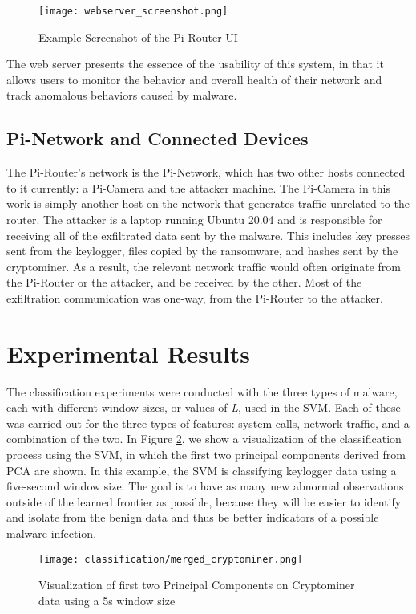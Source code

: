 \documentclass[runningheads]{llncs}
\begin{document}
\begin{figure}
    \centering
    \texttt{[image: webserver\_screenshot.png]}
    \caption{Example Screenshot of the Pi-Router UI\label{fig:webserver}}
\end{figure}

\indent The web server presents the essence of the usability of this system, in that it allows users to monitor the behavior and overall health of their network and track anomalous behaviors caused by malware.

\subsection{Pi-Network and Connected Devices}
The Pi-Router's network is the Pi-Network, which has two other hosts connected to it currently: a Pi-Camera and the attacker machine. The Pi-Camera in this work is simply another host on the network that generates traffic unrelated to the router. The attacker is a laptop running Ubuntu 20.04 and is responsible for receiving all of the exfiltrated data sent by the malware. This includes key presses sent from the keylogger, files copied by the ransomware, and hashes sent by the cryptominer. As a result, the relevant network traffic would often originate from the Pi-Router or the attacker, and be received by the other. Most of the exfiltration communication was one-way, from the Pi-Router to the attacker.

\section{Experimental Results}
The classification experiments were conducted with the three types of malware, each with different window sizes, or values of \emph{L}, used in the SVM. Each of these was carried out for the three types of features: system calls, network traffic, and a combination of the two. In Figure \ref{fig:keylogger_classification}, we show a visualization of the classification process using the SVM, in which the first two principal components derived from PCA are shown. In this example, the SVM is classifying keylogger data using a five-second window size. The goal is to have as many new abnormal observations outside of the learned frontier as possible, because they will be easier to identify and isolate from the benign data and thus be better indicators of a possible malware infection.

\begin{figure}
    \centering
    \texttt{[image: classification/merged\_cryptominer.png]}
    \caption{Visualization of first two Principal Components on Cryptominer data using a 5s window size\label{fig:keylogger_classification}}
\end{figure}
\end{document}
